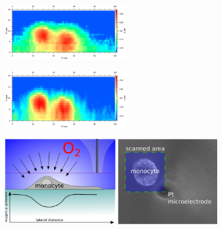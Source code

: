 \documentclass{beamer}
\begin{document}
\begin{frame}[plain]

        \centering
        \includegraphics[width=0.4\textwidth]{original.eps}
	
	\includegraphics[width=0.4\textwidth]{deconvoluted.eps}



\vfill
\end{frame}


\begin{frame}[plain]

        \centering
        \includegraphics[width=0.7\textwidth]{oxygen.eps}

\end{frame}
\end{document}
